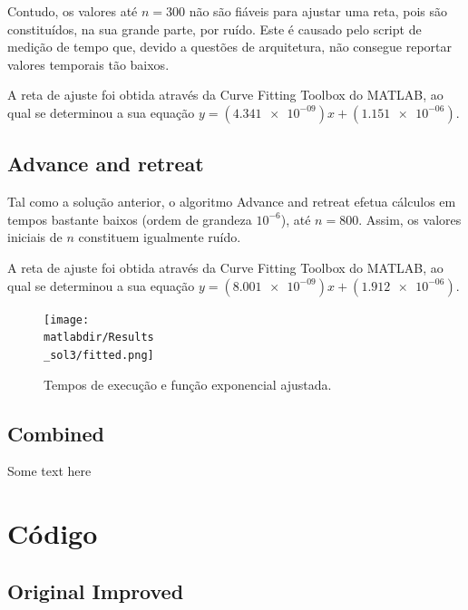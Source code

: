 \documentclass[portuguese,11pt,a4paper,titlepage]{article}
\newcommand{\srcdir}{..}
\newcommand{\matlabdir}{"../MATLAB fittings"}
\begin{document}
Contudo, os valores até \begin{math}n = 300\end{math} não são fiáveis para ajustar uma reta,
pois são constituídos, na sua grande parte, por ruído.
Este é causado pelo script de medição de tempo que, devido a questões de arquitetura,
não consegue reportar valores temporais tão baixos.

A reta de ajuste foi obtida através da Curve Fitting Toolbox do MATLAB, ao qual se determinou
a sua equação \begin{math}y=(\num{4.341e-09})x+(\num{1.151e-06})\end{math}.
\pagebreak
\subsection{Advance and retreat}
Tal como a solução anterior, o algoritmo Advance and retreat efetua cálculos em tempos bastante baixos
(ordem de grandeza \begin{math}10^{-6}\end{math}), até \begin{math}n = 800\end{math}.
Assim, os valores iniciais de \begin{math}n\end{math} constituem igualmente ruído.

A reta de ajuste foi obtida através da Curve Fitting Toolbox do MATLAB, ao qual se determinou
a sua equação \begin{math}y=(\num{8.001e-09})x+(\num{1.912e-06})\end{math}.
\begin{figure}[h]
	\centering
	\texttt{[image: \\matlabdir/Results\\\_sol3/fitted.png]}
	\caption{Tempos de execução e função exponencial ajustada.}
	\label{fig:sol2}
\end{figure}

\subsection{Combined}
Some text here
\pagebreak

\section{Código}
\subsection{Original Improved}

\pagebreak
\end{document}
